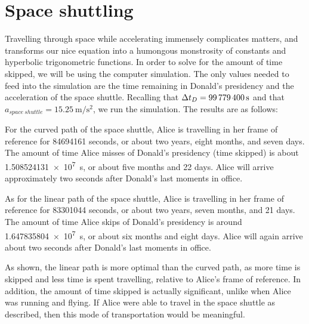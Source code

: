 \section{Space shuttling}
	Travelling through space while accelerating immensely complicates matters, and transforms our nice equation into a humongous monstrosity of constants and hyperbolic trigonometric functions. In order to solve for the amount of time skipped, we will be using the computer simulation. The only values needed to feed into the simulation are the time remaining in Donald's presidency and the acceleration of the space shuttle. Recalling that $\mathrm{\Delta} t_D = \SI{99779400}{\second}$ and that $a_{space\ shuttle} = \SI{15.25}{\metre/\second^2}$, we run the simulation. The results are as follows:

	For the curved path of the space shuttle, Alice is travelling in her frame of reference for \num{84694161} seconds, or about two years, eight months, and seven days. The amount of time Alice misses of Donald’s presidency (time skipped) is about \SI{1.508524131e7}{\second}, or about five months and 22 days. Alice will arrive approximately two seconds after Donald’s last moments in office.

As for the linear path of the space shuttle, Alice is travelling in her frame of reference for \num{83301044} seconds, or about two years, seven months, and 21 days. The amount of time Alice skips of Donald’s presidency is around \SI{1.647835804e7}{\second}, or about six months and eight days. Alice will again arrive about two seconds after Donald’s last moments in office.

As shown, the linear path is more optimal than the curved path, as more time is skipped and less time is spent travelling, relative to Alice’s frame of reference. In addition, the amount of time skipped is actually significant, unlike when Alice was running and flying. If Alice were able to travel in the space shuttle as described, then this mode of transportation would be meaningful.
